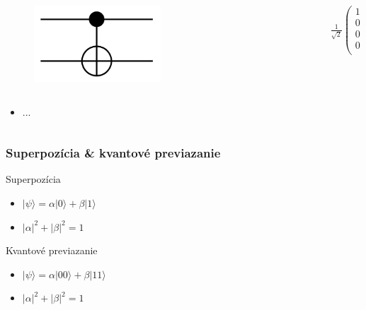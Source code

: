 \documentclass{beamer}
\newcommand{\ket}[1]{\lvert#1\rangle} %
\newcommand\abs[1]{\left|#1\right|}
\begin{document}
\begin{frame}
\begin{columns}[t]
\begin{column}{.5\textwidth}
\begin{itemize}
			\end{itemize}
				
				
			\begin{columns}[c]
								
				\begin{column}{.5\textwidth}
					\begin{figure}
						\includegraphics[width=0.5\textwidth]{cnot_gate.png}
					\end{figure}
				\end{column}
				\begin{column}{.5\textwidth}
					$\frac{1}{\sqrt{2}}\begin{pmatrix}
					1 & 0 & 0 & 0\\
					0 & 1 & 0 & 0\\
					0 & 0 & 0 & 1\\
					0 & 0 & 1 & 0\\
					\end{pmatrix}$
				\end{column}
					
			\end{columns}
			\begin{itemize}
				\item ...
				      
			\end{itemize}
		\end{column}
	\end{columns}     
	        
		
		  
\end{frame}

\begin{frame}
	\frametitle{Superpozícia \& kvantové previazanie}
	Superpozícia
	\begin{itemize}
		\item $\ket{\psi} = \alpha\ket{0} + \beta\ket{1}$
		\item $\abs{\alpha}^2 + \abs{\beta}^2 = 1$
		
	\end{itemize}
	Kvantové previazanie
	\begin{itemize}
		\item $\ket{\psi} = \alpha\ket{00} + \beta\ket{11}$
		\item $\abs{\alpha}^2 + \abs{\beta}^2 = 1$
		
	\end{itemize}
\end{frame}
\end{document}
